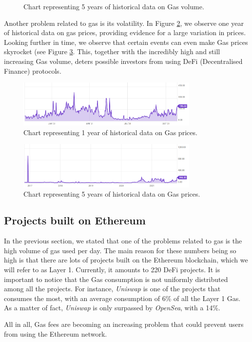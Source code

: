 \begin{figure}[htbp]
    \caption{Chart representing 5 years of historical data on Gas volume.}
    \label{fig:gas_volume}
\end{figure}

Another problem related to gas is its volatility. In Figure \ref{fig:gas_prices}, we observe one year of historical data on gas prices, providing evidence for a large variation in prices. Looking further in time, we observe that certain events can even make Gas prices skyrocket (see Figure \ref{fig:gas_prices5}. This, together with the incredibly high and still increasing Gas volume, deters possible investors from using DeFi (Decentralised Finance) protocols. 

\begin{figure}[htbp]
    \centerline{\includegraphics[width=90mm]{figures/gas_prices.PNG}}
    \caption{Chart representing 1 year of historical data on Gas prices.}
    \label{fig:gas_prices}
\end{figure}

\begin{figure}[htbp]
    \centerline{\includegraphics[width=90mm]{figures/gas_prices5.PNG}}
    \caption{Chart representing 5 years of historical data on Gas prices.}
    \label{fig:gas_prices5}
\end{figure}

\subsection{Projects built on Ethereum}
In the previous section, we stated that one of the problems related to gas is the high volume of gas used per day. The main reason for these numbers being so high is that there are lots of projects built on the Ethereum blockchain, which we will refer to as Layer 1. Currently, it amounts to 220 DeFi projects. It is important to notice that the Gas consumption is not uniformly distributed among all the projects. For instance, \textit{Uniswap}\cite{adamsUniswapV2Core} is one of the projects that consumes the most, with an average consumption of 6\% of all the Layer 1 Gas. As a matter of fact, \textit{Uniswap} is only surpassed by \textit{OpenSea}\cite{OpenSeaDeveloperDocumentation}, with a 14\%. 

All in all, Gas fees are becoming an increasing problem that could prevent users from using the Ethereum network. 